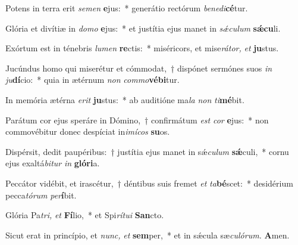 \item Potens in terra erit \textit{semen} \textbf{e}jus:~* generátio rectórum \textit{benedi}\textbf{cé}tur.
\item Glória et divítiæ in \textit{domo} \textbf{e}jus:~* et justítia ejus manet in \textit{sǽculum} \textbf{sǽcu}li.
\item Exórtum est in ténebris \textit{lumen} \textbf{re}ctis:~* miséricors, et mise\textit{rátor,} \textit{et} \textbf{ju}stus.
\item Jucúndus homo qui miserétur et cómmodat,~† dispónet sermónes suos \textit{in} \textit{ju}\textbf{dí}cio:~* quia in ætérnum \textit{non} \textit{commo}\textbf{vébi}tur.
\item In memória ætérna \textit{erit} \textbf{ju}stus:~* ab auditióne ma\tinyhspace\textit{la} \textit{non} \textit{ti}\textbf{mé}bit.
\item Parátum cor ejus speráre in Dómino,~† confirmátum \textit{est} \textit{cor} \textbf{e}jus:~* non commovébitur donec despíciat in\textit{imícos} \textbf{su}os.
\item Dispérsit, dedit paupéribus:~† justítia ejus manet in sǽ\tinyhspace\textit{culum} \textbf{sǽ}culi,~* cornu ejus exaltá\tinyhspace\textit{bitur} \textit{in} \textbf{glóri}a.
\item Peccátor vidébit, et irascétur,~† déntibus suis fremet \textit{et} \textit{ta}\textbf{bé}scet:~* desidérium pecca\tinyhspace\textit{tórum} \textit{per}\textbf{í}bit.
\item Glória Pa\hspace{0.04em}\textit{tri,} \textit{et} \textbf{Fí}lio,~* et Spi\textit{rítui} \textbf{San}cto.
\item Sicut erat in princípio, et \textit{nunc,} \textit{et} \textbf{sem}per,~* et in sǽcula sæ\tinyhspace\textit{culórum.} \textbf{A}men.
